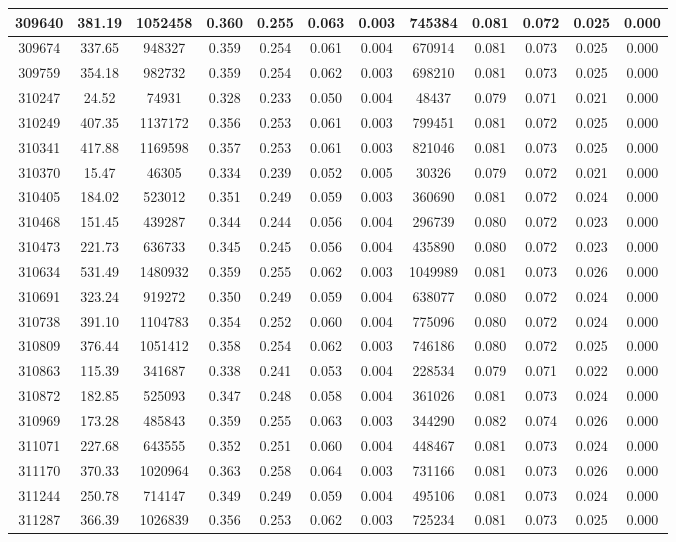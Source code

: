 \documentclass[10pt]{extarticle}
\begin{document}
\begin{longtable}{|c|c|c|c|c|c|c|c|c|c|c|c|}
\hline 
309640&381.19&1052458&0.360&0.255&0.063&0.003&745384&0.081&0.072&0.025&0.000 \\ 
\hline 
309674&337.65&948327&0.359&0.254&0.061&0.004&670914&0.081&0.073&0.025&0.000 \\ 
\hline 
309759&354.18&982732&0.359&0.254&0.062&0.003&698210&0.081&0.073&0.025&0.000 \\ 
\hline 
310247&24.52&74931&0.328&0.233&0.050&0.004&48437&0.079&0.071&0.021&0.000 \\ 
\hline 
310249&407.35&1137172&0.356&0.253&0.061&0.003&799451&0.081&0.072&0.025&0.000 \\ 
\hline 
310341&417.88&1169598&0.357&0.253&0.061&0.003&821046&0.081&0.073&0.025&0.000 \\ 
\hline 
310370&15.47&46305&0.334&0.239&0.052&0.005&30326&0.079&0.072&0.021&0.000 \\ 
\hline 
310405&184.02&523012&0.351&0.249&0.059&0.003&360690&0.081&0.072&0.024&0.000 \\ 
\hline 
310468&151.45&439287&0.344&0.244&0.056&0.004&296739&0.080&0.072&0.023&0.000 \\ 
\hline 
310473&221.73&636733&0.345&0.245&0.056&0.004&435890&0.080&0.072&0.023&0.000 \\ 
\hline 
310634&531.49&1480932&0.359&0.255&0.062&0.003&1049989&0.081&0.073&0.026&0.000 \\ 
\hline 
310691&323.24&919272&0.350&0.249&0.059&0.004&638077&0.080&0.072&0.024&0.000 \\ 
\hline 
310738&391.10&1104783&0.354&0.252&0.060&0.004&775096&0.080&0.072&0.024&0.000 \\ 
\hline 
310809&376.44&1051412&0.358&0.254&0.062&0.003&746186&0.080&0.072&0.025&0.000 \\ 
\hline 
310863&115.39&341687&0.338&0.241&0.053&0.004&228534&0.079&0.071&0.022&0.000 \\ 
\hline 
310872&182.85&525093&0.347&0.248&0.058&0.004&361026&0.081&0.073&0.024&0.000 \\ 
\hline 
310969&173.28&485843&0.359&0.255&0.063&0.003&344290&0.082&0.074&0.026&0.000 \\ 
\hline 
311071&227.68&643555&0.352&0.251&0.060&0.004&448467&0.081&0.073&0.024&0.000 \\ 
\hline 
311170&370.33&1020964&0.363&0.258&0.064&0.003&731166&0.081&0.073&0.026&0.000 \\ 
\hline 
311244&250.78&714147&0.349&0.249&0.059&0.004&495106&0.081&0.073&0.024&0.000 \\ 
\hline 
311287&366.39&1026839&0.356&0.253&0.062&0.003&725234&0.081&0.073&0.025&0.000 \\ 

\end{longtable}
\end{document}
